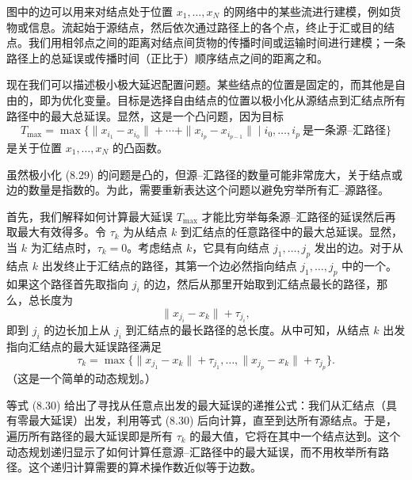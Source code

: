 \documentclass[UTF8, 12pt, fontset=fandol, oneside]{ctexart}
\begin{document}
图中的边可以用来对结点处于位置 $x_1,\ldots,x_N$ 的网络中的某些流进行建模，例如货物或信息。流起始于源结点，然后依次通过路径上的各个点，终止于汇或目的结点。我们用相邻点之间的距离对结点间货物的传播时间或运输时间进行建模；一条路径上的总延误或传播时间（正比于）顺序结点之间的距离之和。

现在我们可以描述极小极大延迟配置问题。某些结点的位置是固定的，而其他是自由的，即为优化变量。目标是选择自由结点的位置以极小化从源结点到汇结点所有路径中的最大总延误。显然，这是一个凸问题，因为目标
\[
T_{\max}=\max\{\|x_{i_1}-x_{i_0}\|+\cdots+\|x_{i_p}-x_{i_{p-1}}\|\mid i_0,\ldots,i_p\ \mbox{是一条源--汇路径}\}
\tag{8.29}
\]
是关于位置 $x_1,\ldots,x_N$ 的凸函数。

虽然极小化 (8.29) 的问题是凸的，但源--汇路径的数量可能非常庞大，关于结点或边的数量是指数的。为此，需要重新表达这个问题以避免穷举所有汇--源路径。

首先，我们解释如何计算最大延误 $T_{\max}$ 才能比穷举每条源--汇路径的延误然后再取最大有效得多。令 $\tau_k$ 为从结点 $k$ 到汇结点的任意路径中的最大总延误。显然，当 $k$ 为汇结点时，$\tau_k=0$。考虑结点 $k$，它具有向结点 $j_1,\ldots,j_p$ 发出的边。对于从结点 $k$ 出发终止于汇结点的路径，其第一个边必然指向结点 $j_1,\ldots,j_p$ 中的一个。如果这个路径首先取指向 $j_i$ 的边，然后从那里开始取到汇结点最长的路径，那么，总长度为
\[
\|x_{j_i}-x_k\|+\tau_{j_i},
\]
即到 $j_i$ 的边长加上从 $j_i$ 到汇结点的最长路径的总长度。从中可知，从结点 $k$ 出发指向汇结点的最大延误路径满足
\[
\tau_k=\max\{\|x_{j_1}-x_k\|+\tau_{j_1},\ldots,\|x_{j_p}-x_k\|+\tau_{j_p}\}.
\tag{8.30}
\]
（这是一个简单的动态规划。）

等式 (8.30) 给出了寻找从任意点出发的最大延误的递推公式：我们从汇结点（具有零最大延误）出发，利用等式 (8.30) 后向计算，直至到达所有源结点。于是，遍历所有路径的最大延误即是所有 $\tau_k$ 的最大值，它将在其中一个结点达到。这个动态规划递归显示了如何计算任意源--汇路径中的最大延误，而不用枚举所有路径。这个递归计算需要的算术操作数近似等于边数。
\end{document}
